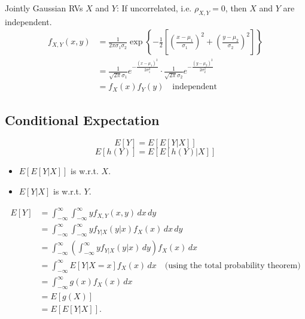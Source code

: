 \begin{example} Jointly Gaussian RVs $X$ and $Y$: If uncorrelated, i.e. $\rho_{X,Y} = 0$, then $X$ and $Y$ are independent.
    \begin{align*}
    f_{X,Y}(x, y) &= \frac{1}{2\pi \sigma_1 \sigma_2} 
    \exp \left\{ 
    -\frac{1}{2} 
    \left[ 
    \left(\frac{x-\mu_1}{\sigma_1}\right)^2 
    + 
    \left(\frac{y-\mu_2}{\sigma_2}\right)^2 
    \right] 
    \right\} \\
    &= \frac{1}{\sqrt{2\pi} \sigma_1} e^{-\frac{(x-\mu_1)^2}{2\sigma_1^2}} 
    \cdot 
    \frac{1}{\sqrt{2\pi} \sigma_2} e^{-\frac{(y-\mu_2)^2}{2\sigma_2^2}} \\
    &= f_X(x) f_Y(y) \quad \text{independent}
    \end{align*}
\end{example}

\subsection{Conditional Expectation}
\begin{definition}
    \begin{equation}
        E[Y] = E[E[Y|X]]
    \end{equation}
    \begin{equation}
        E[h(Y)] = E[E[h(Y)|X]]
    \end{equation}
\end{definition}

\begin{notes}
    \begin{itemize}
        \item $E[E[Y|X]]$ is w.r.t. $X$.
        \item $E[Y|X]$ is w.r.t. $Y$.
    \end{itemize}
\end{notes}

\begin{derivation}
    \begin{align*}
    E[Y] &= \int_{-\infty}^\infty \int_{-\infty}^\infty y f_{X,Y}(x, y) \, dx \, dy \\
            &= \int_{-\infty}^\infty \int_{-\infty}^\infty y f_{Y|X}(y|x) f_X(x) \, dx \, dy \\
            &= \int_{-\infty}^\infty \left( \int_{-\infty}^\infty y f_{Y|X}(y|x) \, dy \right) f_X(x) \, dx \\
            &= \int_{-\infty}^\infty E[Y|X=x] f_X(x) \, dx \quad \text{(using the total probability theorem)} \\
            &= \int_{-\infty}^\infty g(x) f_X(x) \, dx \\
            &= E[g(X)] \\ 
            &= E[E[Y|X]].
    \end{align*}
\end{derivation}

